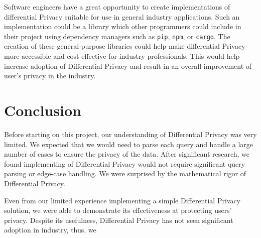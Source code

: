\documentclass[conference,11pt]{IEEEtran}
\begin{document}
Software engineers have a great opportunity to create implementations of
differential Privacy suitable for use in general industry applications. Such an
implementation could be a library which other programmers could include in their
project using dependency managers such as \texttt{pip}, \texttt{npm}, or
\texttt{cargo}. The creation of these general-purpose libraries could help make
differential Privacy more accessible and cost effective for industry
professionals. This would help increase adoption of Differential Privacy and
result in an overall improvement of user's privacy in the industry.

\section{Conclusion}\label{sec:conclusion}
Before starting on this project, our understanding of Differential Privacy was
very limited. We expected that we would need to parse each query and handle a
large number of cases to ensure the privacy of the data.
After significant research, we found implementing of Differential Privacy would
not require significant query parsing or edge-case handling. We were surprised
by the mathematical rigor of Differential Privacy.

Even from our limited experience implementing a simple Differential Privacy
solution, we were able to demonstrate its effectiveness at protecting users'
privacy. Despite its usefulness, Differential Privacy has not seen significant
adoption in industry, thus, we %

{\printbibliography}
\end{document}
